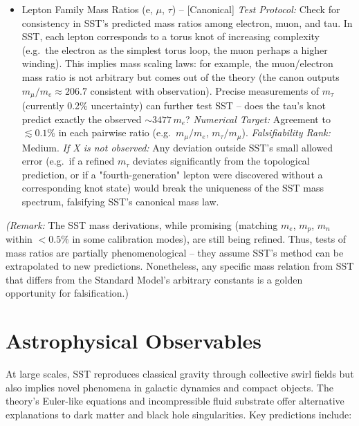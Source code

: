 \documentclass[11pt]{article}
\begin{document}
\begin{itemize}
\item
Lepton Family Mass Ratios (e, $\mu$, $\tau$) -- [Canonical] \textit{Test Protocol:} Check for consistency in SST's predicted mass ratios among electron, muon, and tau. In SST, each lepton corresponds to a torus knot of increasing complexity (e.g.\ the electron as the simplest torus loop, the muon perhaps a higher winding). This implies mass scaling laws: for example, the muon/electron mass ratio is not arbitrary but comes out of the theory (the canon outputs $m_\mu/m_e \approx 206.7$ consistent with observation). Precise measurements of $m_\tau$ (currently 0.2\% uncertainty) can further test SST -- does the tau's knot predict exactly the observed $\sim3477\,m_e$? \textit{Numerical Target:} Agreement to $\lesssim0.1\%$ in each pairwise ratio (e.g.\ $m_\mu/m_e$, $m_\tau/m_\mu$). \textit{Falsifiability Rank:} Medium. \textit{If X is not observed:} Any deviation outside SST's small allowed error (e.g.\ if a refined $m_\tau$ deviates significantly from the topological prediction, or if a "fourth-generation" lepton were discovered without a corresponding knot state) would break the uniqueness of the SST mass spectrum, falsifying SST's canonical mass law.

\end{itemize}

\textit{(Remark:} The SST mass derivations, while promising (matching $m_e$, $m_p$, $m_n$ within $<0.5\%$ in some calibration modes), are still being refined. Thus, tests of mass ratios are partially phenomenological -- they assume SST's method can be extrapolated to new predictions. Nonetheless, any specific mass relation from SST that differs from the Standard Model's arbitrary constants is a golden opportunity for falsification.)

\section*{Astrophysical Observables}

At large scales, SST reproduces classical gravity through collective swirl fields but also implies novel phenomena in galactic dynamics and compact objects. The theory's Euler-like equations and incompressible fluid substrate offer alternative explanations to dark matter and black hole singularities. Key predictions include:
\end{document}
